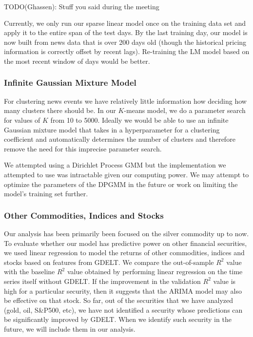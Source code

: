
TODO(Ghassen): Stuff you said during the meeting

Currently, we only run our sparse linear model once on the training data set and apply it to the entire span of the test days. By the last training day, our model is now built from news data that is over 200 days old (though the historical pricing information is correctly offset by recent lags). Re-training the LM model based on the most recent window of days would be better.

\subsubsection{Infinite Gaussian Mixture Model}
For clustering news events we have relatively little information how deciding how many clusters there should be. In our $K$-means model, we do a parameter search for values of $K$ from 10 to 5000. Ideally we would be able to use an infinite Gaussian mixture model that takes in a hyperparameter for a clustering coefficient and automatically determines the number of clusters and therefore remove the need for this imprecise parameter search. 

We attempted using a Dirichlet Process GMM but the implementation we attempted to use was intractable given our computing power. We may attempt to optimize the parameters of the DPGMM in the future or work on limiting the model's training set further. 

\subsubsection{Other Commodities, Indices and Stocks}
Our analysis has been primarily been focused on the silver commodity up to now. To evaluate whether our model has predictive power on other financial securities, we used linear regression to model the returns of other commodities, indices and stocks based on features from GDELT. We compare the out-of-sample $R^2$ value with the baseline $R^2$ value obtained by performing linear regression on the time series itself without GDELT. If the improvement in the validation $R^2$ value is high for a particular security, then it suggests that the ARIMA model may also be effective on that stock. So far, out of the securities that we have analyzed (gold, oil, S\&P500, etc), we have not identified a security whose predictions can be significantly improved by GDELT. When we identify such security in the future, we will include them in our analysis.

